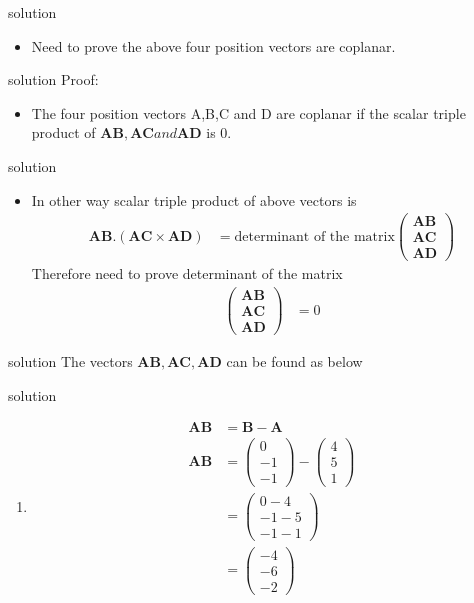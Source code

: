 \documentclass{beamer}
\let\vec\mathbf
\newcommand{\myvec}[1]{\ensuremath{\begin{pmatrix}#1\end{pmatrix}}}
\begin{document}
\begin{frame}{solution}
\begin{itemize}
    \item Need to prove the above four position vectors are coplanar.
\end{itemize}
\end{frame}
 
 
 \begin{frame}{solution}
 Proof:
 \begin{itemize}
 \item The four position vectors A,B,C and D are coplanar if the scalar triple product of $\vec{AB},\vec{AC} and \vec{AD}$ is $0.$
\end{itemize}
\end{frame}


\begin{frame}{solution}
\begin{itemize}
\item In other way scalar triple product of above vectors is 
\begin{align}
      \vec{AB}.(\vec{AC} \times \vec{AD}) & = \text{determinant of the matrix} \myvec{\vec{AB}\\\vec{AC}\\\vec{AD}}
      \end{align}
Therefore need to prove determinant of the matrix
\begin{align}
    \myvec{\vec{AB}\\\vec{AC}\\\vec{AD}} & = 0
\end{align}
\end{itemize}
 \end{frame}
 
 
 \begin{frame}{solution}
 The vectors $\vec{AB},\vec{AC},\vec{AD}$ can be found as below
 \end{frame}
 
 
 \begin{frame}{solution}
 \begin{enumerate}
 \item 
 \begin{align}
     \vec{AB} & = \vec{B}-\vec{A}\\
     \vec{AB} & = \myvec{0\\-1\\-1}-\myvec{4\\5\\1}\nonumber\\
              & = \myvec{0-4\\ -1-5\\-1-1}\nonumber\\
              & = \myvec{-4\\-6\\-2}
\end{align}
\end{enumerate}
\end{frame}
 
\end{document}
